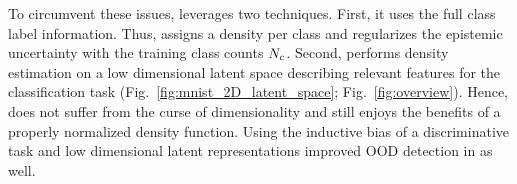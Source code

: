 To circumvent these issues, \PostNetacro leverages two techniques. First, it uses the full class label information. Thus, \PostNetacro assigns a density per class and regularizes the epistemic uncertainty with the training class counts $N_c$. Second, \PostNetacro performs density estimation on a low dimensional latent space describing relevant features for the classification task (Fig.~\ref{fig:mnist_2D_latent_space}; Fig.~\ref{fig:overview}).
Hence, \PostNetacro does not suffer from the curse of dimensionality and still enjoys the benefits of a properly normalized density function. Using the inductive bias of a discriminative task and low dimensional latent representations improved OOD detection in  \cite{nf_fail_ood} as well.
